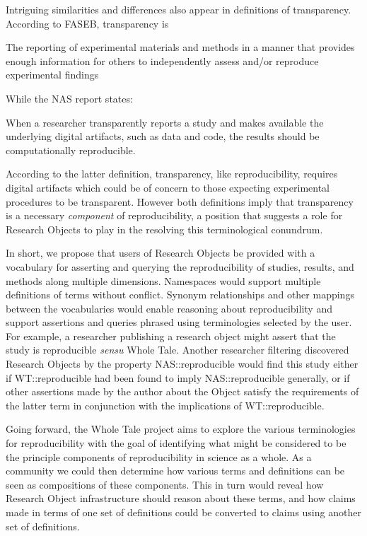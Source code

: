 Intriguing similarities and differences also appear in definitions of transparency. According to FASEB, transparency is

	The reporting of experimental materials and methods in a manner that provides enough information 
	for others to independently assess and/or reproduce experimental findings

While the NAS report states:

	When a researcher transparently reports a study and makes available the underlying digital artifacts, such as data and code, 
	the results should be computationally reproducible.

According to the latter definition, transparency, like reproducibility, requires digital artifacts which could be of concern to
	those expecting experimental procedures to be transparent.
However both definitions imply that transparency is a necessary \emph{component} of reproducibility, a position that
	suggests a role for Research Objects to play in the resolving this terminological conundrum.

In short, we propose that users of Research Objects be provided with a vocabulary for asserting and querying the reproducibility
	of studies, results, and methods along multiple dimensions. 
Namespaces would support multiple definitions of terms without conflict.
Synonym relationships and other mappings between the vocabularies would enable reasoning about reproducibility
	 and support assertions and queries phrased using terminologies selected by the user.
For example, a researcher publishing a research object might assert that the study is reproducible \emph{sensu} Whole Tale.
Another researcher filtering discovered Research Objects by the property NAS::reproducible would find this study
	either if WT::reproducible had been found to imply NAS::reproducible generally, or if other assertions made by the author
	about the Object satisfy the requirements of the latter term in conjunction with the implications of  WT::reproducible.

Going forward, the Whole Tale project aims to explore the various terminologies for reproducibility with the goal of identifying 
	what might be considered to be the principle components of reproducibility in science as a whole.
As a community we could then determine how various terms and definitions can be seen as compositions of these components.
This in turn would reveal how Research Object infrastructure should reason about these terms, and  how claims 
	made in terms of one set of definitions could be converted to claims using another set of definitions.


